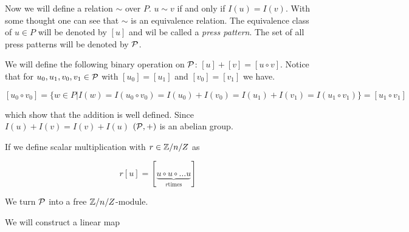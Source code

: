 Now we will define a relation $\sim$ over $P$. $u \sim v$ if and only if $I(u) = I(v)$. With some thought one
can see that $\sim$ is an equivalence relation. The equivalence class of $u\in P$ will be denoted by $[u]$
and wil be called a \emph{press pattern}.
The set of all press patterns will be denoted by $\mathcal{P}$.

We will define the following binary operation on $\mathcal{P}$: $[u] + [v] = [u\circ v]$. Notice that for
$u_{0}, u_{1}, v_{0}, v_{1}\in\mathcal{P}$ with $[u_{0}] = [u_{1}]$ and $[v_{0}] = [v_{1}]$ we have.

\[
    [u_{0}\circ v_{0}] = 
    \{w\in P|
    I(w)=I(u_{0}\circ v_{0}) = I(u_{0})+I(v_{0}) = I(u_{1})+I(v_{1}) = I(u_{1}\circ v_{1})
    \} =
    [u_{1}\circ v_{1}]
\]

which show that the addition is well defined. Since $I(u) + I(v) = I(v) + I(u)$
$\left(\mathcal{P}, +\right)$ is an abelian group.

If we define scalar multiplication with $r\in\mathbb{Z}/n/Z$ as

\[
    r[u] = [\underbrace{u\circ u\circ\ldots u}_{r\text{times}}]
\]

We turn $\mathcal{P}$ into a free $\mathbb{Z}/n/Z$-module.

We will construct a linear map